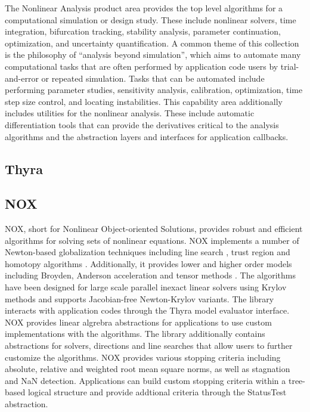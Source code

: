 
The Nonlinear Analysis product area provides the top level algorithms for a computational simulation or design study.
These include nonlinear solvers, time integration, bifurcation tracking, stability analysis, parameter continuation, optimization, and uncertainty quantification.
A common theme of this collection is the philosophy of ``analysis beyond simulation'', which aims to automate many computational tasks that are often performed by application code users by trial-and-error or repeated simulation.
Tasks that can be automated include performing parameter studies, sensitivity analysis, calibration, optimization, time step size control, and locating instabilities.
This capability area additionally includes utilities for the nonlinear analysis. These include automatic differentiation tools that can provide the derivatives critical to the analysis algorithms and the abstraction layers and interfaces for application callbacks.

\subsection{Thyra}

\subsection{NOX}
NOX, short for Nonlinear Object-oriented Solutions, provides robust and efficient algorithms for solving sets of nonlinear equations.
NOX implements a number of Newton-based globalization techniques including line search \cite{Pawlowski2006}, trust region \cite{Pawlowski2006,Pawlowski2008} and homotopy algorithms \cite{Coffey2003}.
Additionally, it provides lower and higher order models including Broyden, Anderson acceleration \cite{Walker2011} and tensor methods \cite{Bader2005}.
The algorithms have been designed for large scale parallel inexact linear solvers using Krylov methods and supports Jacobian-free Newton-Krylov variants.
The library interacts with application codes through the Thyra model evaluator interface.
NOX provides linear algrebra abstractions for applications to use custom implementations with the algorithms.
The library additionally contains abstractions for solvers, directions and line searches that allow users to further customize the algorithms.
NOX provides various stopping criteria including absolute, relative and weighted root mean square norms, as well as stagnation and NaN detection.
Applications can build custom stopping criteria within a tree-based logical structure and provide addtional criteria through the StatusTest abstraction.

